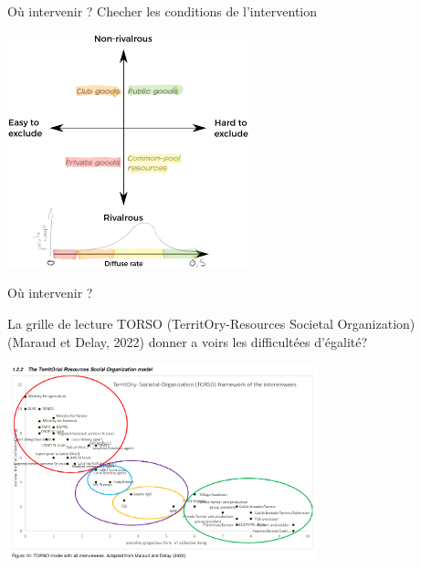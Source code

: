 \documentclass[newPxFont]{beamer}
\begin{document}
\begin{frame}[c]{Où intervenir ?}
  \vspace{-1cm}
  Checher les conditions de l'intervention
  \begin{center}
  \includegraphics[width=7cm]{img/matrix_commons-proj42.pdf}
  \end{center}
\end{frame}

\begin{frame}[c]{Où intervenir ?}
    \vspace{-1cm}

   La grille de lecture TORSO (TerritOry-Resources Societal Organization) (Maraud et Delay, 2022) donner a voirs les difficultées d'égalité? 
  \begin{center}
   \includegraphics[width=9cm]{img/torso_mathilde.png}
  \end{center}

\end{frame}
\end{document}
